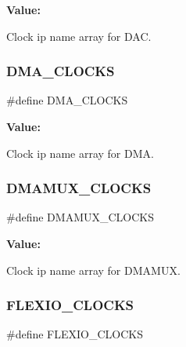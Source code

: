 {\bfseries Value\+:}
\begin{DoxyCode}{0}
\DoxyCodeLine{\{               \(\backslash\)}
\DoxyCodeLine{    \}}

\end{DoxyCode}


Clock ip name array for D\+AC. 

\mbox{\label{group__clock_ga5a8ba9cbce79bf443b2b1ba97d4c5475}} 
\subsubsection{\texorpdfstring{DMA\_CLOCKS}{DMA\_CLOCKS}}
{\footnotesize\ttfamily \#define D\+M\+A\+\_\+\+C\+L\+O\+C\+KS}

{\bfseries Value\+:}
\begin{DoxyCode}{0}
\DoxyCodeLine{\{               \(\backslash\)}
\DoxyCodeLine{    \}}

\end{DoxyCode}


Clock ip name array for D\+MA. 

\mbox{\label{group__clock_ga28b35d2fe49bfffe6e5e41fbdadfc6ed}} 
\subsubsection{\texorpdfstring{DMAMUX\_CLOCKS}{DMAMUX\_CLOCKS}}
{\footnotesize\ttfamily \#define D\+M\+A\+M\+U\+X\+\_\+\+C\+L\+O\+C\+KS}

{\bfseries Value\+:}
\begin{DoxyCode}{0}
\DoxyCodeLine{\{                  \(\backslash\)}
\DoxyCodeLine{    \}}

\end{DoxyCode}


Clock ip name array for D\+M\+A\+M\+UX. 

\mbox{\label{group__clock_gad3726b58af9ad0aa5b01a28f116957db}} 
\subsubsection{\texorpdfstring{FLEXIO\_CLOCKS}{FLEXIO\_CLOCKS}}
{\footnotesize\ttfamily \#define F\+L\+E\+X\+I\+O\+\_\+\+C\+L\+O\+C\+KS}


